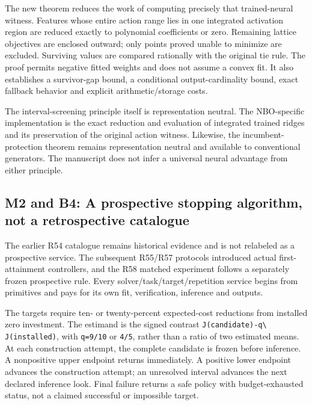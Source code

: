 \documentclass[ecta,nameyear,draft]{econsocart}
\begin{document}
The new theorem reduces the work of computing precisely that
trained-neural witness. Features whose entire action range lies in one
integrated activation region are reduced exactly to polynomial
coefficients or zero. Remaining lattice objectives are enclosed outward;
only points proved unable to minimize are excluded. Surviving values are
compared rationally with the original tie rule. The proof permits
negative fitted weights and does not assume a convex fit. It also
establishes a survivor-gap bound, a conditional output-cardinality
bound, exact fallback behavior and explicit arithmetic/storage costs.

The interval-screening principle itself is representation neutral. The
NBO-specific implementation is the exact reduction and evaluation of
integrated trained ridges and its preservation of the original action
witness. Likewise, the incumbent-protection theorem remains
representation neutral and available to conventional generators. The
manuscript does not infer a universal neural advantage from either
principle.

\hypertarget{m2-and-b4-a-prospective-stopping-algorithm-not-a-retrospective-catalogue}{%
\subsection{M2 and B4: A prospective stopping algorithm, not a
retrospective
catalogue}\label{m2-and-b4-a-prospective-stopping-algorithm-not-a-retrospective-catalogue}}

The earlier R54 catalogue remains historical evidence and is not
relabeled as a prospective service. The subsequent R55/R57 protocols
introduced actual first-attainment controllers, and the R58 matched
experiment follows a separately frozen prospective rule. Every
solver/task/target/repetition service begins from primitives and pays
for its own fit, verification, inference and outputs.

The targets require ten- or twenty-percent expected-cost reductions from
installed zero investment. The estimand is the signed contrast
\nolinkurl{J(candidate)-q\ J(installed)}, with \nolinkurl{q=9/10} or
\nolinkurl{4/5}, rather than a ratio of two estimated means. At each
construction attempt, the complete candidate is frozen before inference.
A nonpositive upper endpoint returns immediately. A positive lower
endpoint advances the construction attempt; an unresolved interval
advances the next declared inference look. Final failure returns a safe
policy with budget-exhausted status, not a claimed successful or
impossible target.
\end{document}
